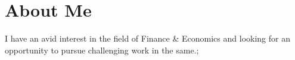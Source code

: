 \documentclass[12pt,a4paper,sans]{moderncv}
\begin{document}
 	\makecvtitle
 	\vspace{-30pt} %
 	\section{\hspace{10em} About Me}{I have an avid interest in the field of Finance \& Economics and looking for an opportunity to pursue challenging work in the same.;}	 %
	 \vspace{-10pt} %
	 
	 \vspace{-10pt}
	 
	 \vspace{-10pt} %
	 
	 \vspace{-10pt} %
	 
	 \pagebreak
	 \vspace{-10pt} %
	 
	 \vspace{-10pt} %
	 
	 \vspace{-10pt} %
	 

 
\end{document}
